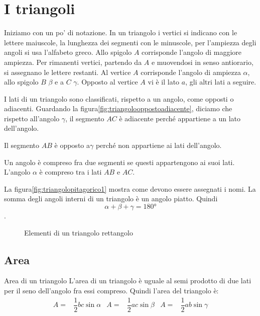 \section{I triangoli}
Iniziamo con un po' di notazione. In un triangolo i  vertici si indicano con le lettere maiuscole, la lunghezza dei segmenti con le  minuscole, per  l'ampiezza degli angoli si usa l'alfabeto greco.  Allo spigolo $A$  corrisponde l'angolo di maggiore  ampiezza. Per rimanenti vertici, partendo  da $A$ e muovendosi in senso antiorario, si assegnano le lettere restanti. Al vertice $A$ corrisponde l'angolo di ampiezza $\alpha$, allo spigolo $B$ $\beta$ e a $C$ $\gamma$. Opposto al vertice $A$ vi è il lato $a$, gli altri lati a seguire.\par 
I lati di un triangolo sono classificati, rispetto a un angolo, come opposti o  adiacenti. Guardando la figura\nobs\vref{fig:triangolooppostoadiacente}, diciamo che rispetto all'angolo $\gamma$, il segmento $AC$ è adiacente perché appartiene a un  lato dell'angolo.\par  Il segmento  $AB$ è opposto a$\gamma$ perché  non appartiene ai lati  dell'angolo.\par
Un angolo è compreso fra due segmenti se questi appartengono ai suoi lati. L'angolo $\alpha$ è compreso tra i lati $AB$ e $AC$.\par 
 La figura\nobs\vref{fig:triangolopitagorico1} mostra come devono essere assegnati i nomi.
La somma degli angoli interni di un triangolo è un angolo piatto. Quindi \[\alpha+\beta+\gamma=\ang{180}\]. 
\begin{figure}
	\centering
	
	\caption{Elementi di un triangolo rettangolo}
	\label{fig:triangolooppostoadiacente}
\end{figure}
\subsection{Area}
\begin{teoremat}{Area di un triangolo}{}
	L'area di un triangolo è uguale al semi prodotto di due lati per il seno dell'angolo fra essi compreso. 
	Quindi l'area del triangolo è:
	\begin{align*}
	A=&\dfrac{1}{2}bc\sin\alpha& A=&\dfrac{1}{2}ac\sin\beta& A=&\dfrac{1}{2}ab\sin\gamma \\
	\end{align*}
\end{teoremat}	
